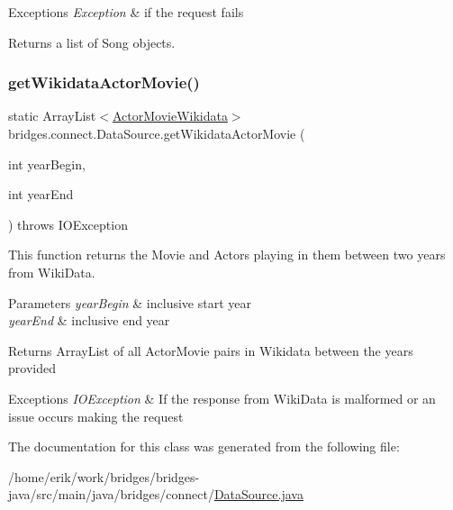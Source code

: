 \begin{DoxyExceptions}{Exceptions}
{\em Exception} & if the request fails\\
\hline
\end{DoxyExceptions}
\begin{DoxyReturn}{Returns}
a list of Song objects. 
\end{DoxyReturn}
\mbox{\label{classbridges_1_1connect_1_1_data_source_ad06946cc793bb990eeb3b9418ade1479}} 
\subsubsection{\texorpdfstring{get\+Wikidata\+Actor\+Movie()}{getWikidataActorMovie()}}
{\footnotesize\ttfamily static Array\+List$<$\hyperlink{classbridges_1_1data__src__dependent_1_1_actor_movie_wikidata}{Actor\+Movie\+Wikidata}$>$ bridges.\+connect.\+Data\+Source.\+get\+Wikidata\+Actor\+Movie (\begin{DoxyParamCaption}\item[{int}]{year\+Begin,  }\item[{int}]{year\+End }\end{DoxyParamCaption}) throws I\+O\+Exception\hspace{0.3cm}{\ttfamily [static]}}



This function returns the Movie and Actors playing in them between two years from Wiki\+Data. 


\begin{DoxyParams}{Parameters}
{\em year\+Begin} & inclusive start year \\
\hline
{\em year\+End} & inclusive end year \\
\hline
\end{DoxyParams}
\begin{DoxyReturn}{Returns}
Array\+List of all Actor\+Movie pairs in Wikidata between the years provided 
\end{DoxyReturn}

\begin{DoxyExceptions}{Exceptions}
{\em I\+O\+Exception} & If the response from Wiki\+Data is malformed or an issue occurs making the request \\
\hline
\end{DoxyExceptions}


The documentation for this class was generated from the following file\+:\begin{DoxyCompactItemize}
\item 
/home/erik/work/bridges/bridges-\/java/src/main/java/bridges/connect/\hyperlink{_data_source_8java}{Data\+Source.\+java}\end{DoxyCompactItemize}
